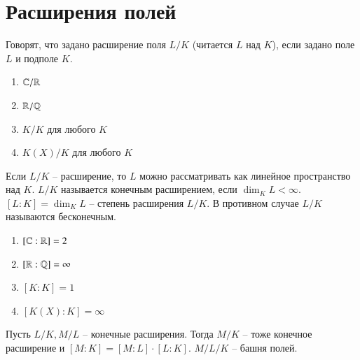 \documentclass[main]{subfiles}
\begin{document}
\chapter{Расширения полей}


\begin{definition}
    Говорят, что задано расширение поля $L / K$ (читается $L$ над $K$),
     если задано поле $L$ и подполе $K$.
\end{definition}

\begin{example}
    \begin{enumerate}
        \item $\mathbb{C} / \mathbb{R}$
        \item $ \mathbb{R} / \mathbb{Q} $
        \item  $ K / K$ для любого $K$
        \item  $K(X) / K $ для любого $K$
    \end{enumerate}
  
\end{example}

Если $L / K$ -- расширение, то $L$ можно рассматривать как линейное пространство над $K$.
$L / K$ называется конечным расширением, если $\dim_K L < \infty$. 
$[L:K] = \dim_K L $ -- степень расширения $L / K$. В противном случае
$L / K$ называются бесконечным.

\begin{example}
    \begin{enumerate}
        \item $[\mathbb{C}:\mathbb{R}] = 2$
        \item $[\mathbb{R} : \mathbb{Q} ] = \infty$
        \item  $ [K:K] = 1$
        \item $[K(X):K]= \infty $ 
    \end{enumerate}
\end{example}

\begin{proposition}
    Пусть $L / K, M / L$ -- конечные расширения. Тогда $M / K$ -- тоже
    конечное расширение и $[M:K] = [M:L] \cdot [L:K]$.
    $M / L / K $ -- башня полей.
\end{proposition}
\end{document}
